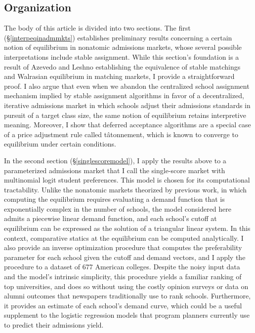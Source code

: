 \documentclass[12pt]{article}
\numberwithin{equation}{subsection}
\theoremstyle{definition}
\begin{document}
\subsection{Organization}
The body of this article is divided into two sections. The first (\S\ref{interpeqinadmmkts}) establishes preliminary results concerning a certain notion of equilibrium in nonatomic admissions markets, whose several possible interpretations include stable assignment. While this section's foundation is a result of Azevedo and Leshno \parencite*{supplydemandfw} establishing the equivalence of stable matchings and Walrasian equilibrium in matching markets, I provide a straightforward proof. I also argue that even when we abandon the centralized school assignment mechanism implied by stable assignment algorithms in favor of a decentralized, iterative admissions market in which schools adjust their admissions standards in pursuit of a target class size, the same notion of equilibrium retains interpretive meaning. Moreover, I show that deferred acceptance algorithms are a special case of a price adjustment rule called t\^{a}tonnement, which is known to converge to equilibrium under certain conditions.

In the second section (\S\ref{singlescoremodel}), I apply the results above to a parameterized admissions market that I call the single-score market with multinomial logit student preferences. This model is chosen for its computational tractability. Unlike the nonatomic markets theorized by previous work, in which computing the equilibrium requires evaluating a demand function that is exponentially complex in the number of schools, the model considered here admits a piecewise linear demand function, and each school's cutoff at equilibrium can be expressed as the solution of a triangular linear system. In this context, comparative statics at the equilibrium can be computed analytically. I also provide an inverse optimization procedure that computes the preferability parameter for each school given the cutoff and demand vectors, and I apply the procedure to a dataset of 677 American colleges. Despite the noisy input data and the model's intrinsic simplicity, this procedure yields a familiar ranking of top universities, and does so without using the costly opinion surveys or data on alumni outcomes that newspapers traditionally use to rank schools. Furthermore, it provides an estimate of each school's demand curve, which could be a useful supplement to the logistic regression models that program planners currently use to predict their admissions yield.
\end{document}

